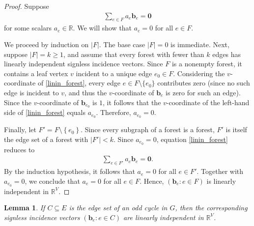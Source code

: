 \documentclass[12pt]{article}
\newtheorem{lemma}[theorem]{Lemma}
\theoremstyle{definition}
\theoremstyle{remark}
\newcommand{\set}[1]{\left\{ #1 \right\}}
\newcommand{\tup}[1]{\left( #1 \right)}
\begin{document}
\begin{proof}
    Suppose \begin{align}\label{linin_forest}
        \sum_{e \in F}a_e\mathbf{b}_e = \mathbf{0}
    \end{align} for some scalars $a_e \in \mathbb{R}$. We will show that $a_e = 0$ for all $e \in F$.

    We proceed by induction on $|F|$. The base case $|F| = 0$ is immediate. Next, suppose $|F| = k \geq 1$, and assume that every forest with fewer than $k$ edges has linearly independent signless incidence vectors. Since $F$ is a nonempty forest, it contains a leaf vertex $v$ incident to a unique edge $e_0 \in F$. Considering the $v$-coordinate of \eqref{linin_forest}, every edge $e \in F \setminus \{e_0\}$ contributes zero (since no such edge is incident to $v$, and thus the $v$-coordinate of $\mathbf{b}_e$ is zero for such an edge). Since the $v$-coordinate of $\mathbf{b}_{e_0}$ is $1$, it follows that
    the $v$-coordinate of the left-hand side of \eqref{linin_forest} equals $a_{e_0}$. Therefore, $a_{e_0} = 0$.

    Finally, let $F' = F \setminus \set{e_0}$. Since every subgraph of a forest is a forest, $F'$ is itself the edge set of a forest with $|F'| < k$. Since $a_{e_0} = 0$, equation \eqref{linin_forest} reduces to \begin{align*}
        \sum_{e \in F'}a_e\mathbf{b}_e = \mathbf{0}.
    \end{align*} By the induction hypothesis, it follows that $a_e = 0$ for all $e \in F'$. Together with $a_{e_0} = 0$, we conclude that $a_e = 0$ for all $e \in F$. Hence, $\tup{\mathbf{b}_e : e \in F}$ is linearly independent in $\mathbb{R}^V$.
\end{proof}

\begin{lemma}\label{odd_cycles_independence}
    If $C \subseteq E$ is the edge set of an odd cycle in $G$, then the corresponding signless incidence vectors $\tup{\mathbf{b}_e : e \in C}$ are linearly independent in $\mathbb{R}^V$.
\end{lemma}
\end{document}
